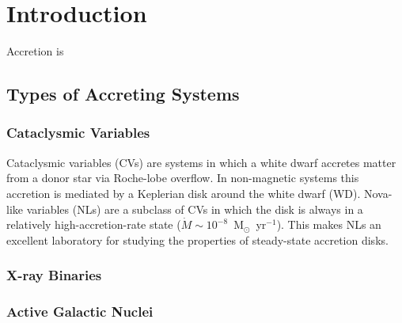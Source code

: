 \chapter{Introduction}

%

Accretion is 



\section{Types of Accreting Systems}

\subsection{Cataclysmic Variables}

Cataclysmic variables (CVs) are systems in which a white dwarf
accretes matter from a donor star via Roche-lobe overflow. In
non-magnetic systems this accretion is mediated by a Keplerian disk
around the white dwarf (WD). Nova-like variables (NLs) are a subclass
of CVs in which the  disk is always in a relatively
high-accretion-rate state ($\dot{M} \sim 10^{-8}$~M$_{\odot}$~yr$^{-1}$).  
This makes NLs an excellent laboratory for studying the properties of 
steady-state accretion disks.

\subsection{X-ray Binaries}


\subsection{Active Galactic Nuclei}